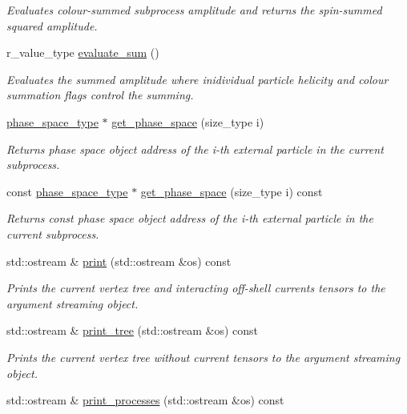 \begin{DoxyCompactItemize}
\begin{DoxyCompactList}\small\item\em Evaluates colour-\/summed subprocess amplitude and returns the spin-\/summed squared amplitude. \end{DoxyCompactList}\item 
r\-\_\-value\-\_\-type \hyperlink{a00070_a6071cbab036da4c1a9d8d00eb7c0609c}{evaluate\-\_\-sum} ()
\begin{DoxyCompactList}\small\item\em Evaluates the summed amplitude where inidividual particle helicity and colour summation flags control the summing. \end{DoxyCompactList}\item 
\hyperlink{a00400}{phase\-\_\-space\-\_\-type} $\ast$ \hyperlink{a00070_a9b3d790cf4f6323684efeda68aab814d}{get\-\_\-phase\-\_\-space} (size\-\_\-type i)
\begin{DoxyCompactList}\small\item\em Returns phase space object address of the i-\/th external particle in the current subprocess. \end{DoxyCompactList}\item 
const \hyperlink{a00400}{phase\-\_\-space\-\_\-type} $\ast$ \hyperlink{a00070_af40f66d9e09e8f7e14f61ddab73b2a5e}{get\-\_\-phase\-\_\-space} (size\-\_\-type i) const 
\begin{DoxyCompactList}\small\item\em Returns const phase space object address of the i-\/th external particle in the current subprocess. \end{DoxyCompactList}\item 
std\-::ostream \& \hyperlink{a00070_a4f1be4b979e9a01b6699018c3ea650d6}{print} (std\-::ostream \&os) const 
\begin{DoxyCompactList}\small\item\em Prints the current vertex tree and interacting off-\/shell currents tensors to the argument streaming object. \end{DoxyCompactList}\item 
std\-::ostream \& \hyperlink{a00070_a36305ac3639cd8043742422e33f17d2e}{print\-\_\-tree} (std\-::ostream \&os) const 
\begin{DoxyCompactList}\small\item\em Prints the current vertex tree without current tensors to the argument streaming object. \end{DoxyCompactList}\item 
\hypertarget{a00070_aebd0e3d1bc1bad0857ea4ceff5e13299}{std\-::ostream \& \hyperlink{a00070_aebd0e3d1bc1bad0857ea4ceff5e13299}{print\-\_\-processes} (std\-::ostream \&os) const }\label{a00070_aebd0e3d1bc1bad0857ea4ceff5e13299}


\end{DoxyCompactItemize}
